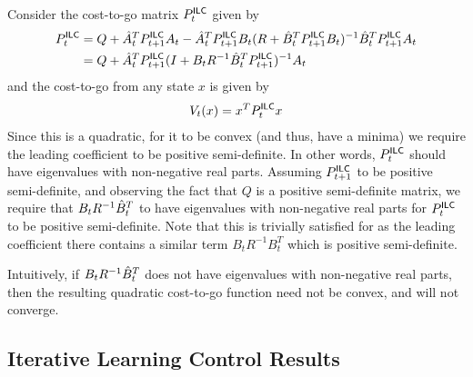 Consider the cost-to-go matrix $P^\mathsf{ILC}_t$ given by
\begin{align*}
  P^\mathsf{ILC}_{t} &= Q + \hat{A}_t^{T}P^\mathsf{ILC}_{{t+1}}A_t - \hat{A}_t^{T}P^\mathsf{ILC}_{t+1}B_t(R + \hat{B}_t^{T}P^\mathsf{ILC}_{{t+1}}B_t)^{-1}\hat{B}_t^{T}P^\mathsf{ILC}_{t+1}A_t \\
  &= Q + \hat{A}_t^{T}P^\mathsf{ILC}_{t+1}(I + B_tR^{-1}\hat{B}_t^{T}P^\mathsf{ILC}_{t+1})^{-1}A_t
\end{align*}
and the cost-to-go from any state $x$ is given by
\begin{align*}
  V_t(x) = x^TP^\mathsf{ILC}_tx
\end{align*}
Since this is a quadratic, for it to be convex (and thus, have a
minima) we require the leading
coefficient to be positive semi-definite. In other words, $P^\mathsf{ILC}_t$
should have eigenvalues with non-negative real parts. Assuming
$P^\mathsf{ILC}_{t+1}$ to be positive semi-definite, and observing the fact
that $Q$ is a positive semi-definite matrix, we require that
$B_tR^{-1}\hat{B}_t^T$ to have eigenvalues with non-negative real parts
for $P^\mathsf{ILC}_t$ to be positive semi-definite. Note that this is
trivially satisfied for \MM{} as the leading coefficient there
contains a similar term $B_tR^{-1}B_t^T$ which is positive
semi-definite.

Intuitively, if $B_tR^{-1}\hat{B}_t^T$ does not have eigenvalues with
non-negative real parts, then the resulting quadratic cost-to-go
function need not be convex, and \ILC{} will not converge.

\subsection{Iterative Learning Control Results}
\label{sec:iter-learn-contr}

